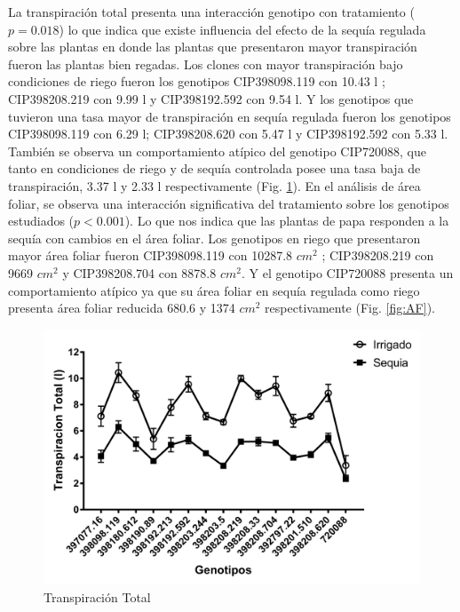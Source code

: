 \documentclass[fleqn,10pt]{Flavio}\usepackage[]{graphicx}\usepackage[]{color}
\begin{document}
La transpiraci\'on total presenta una interacci\'on genotipo con tratamiento ($p = 0.018$) lo que indica que existe influencia del efecto de la sequ\'ia regulada sobre las plantas en donde las plantas que presentaron mayor transpiraci\'on fueron las plantas bien regadas. Los clones con mayor transpiraci\'on bajo condiciones de riego fueron los genotipos CIP398098.119 con 10.43 l ; CIP398208.219 con 9.99 l y  CIP398192.592 con  9.54 l. Y los genotipos que tuvieron una tasa mayor de transpiraci\'on en sequ\'ia regulada fueron los genotipos CIP398098.119 con 6.29 l; CIP398208.620 con 5.47 l y CIP398192.592 con 5.33 l. Tambi\'en se observa un comportamiento at\'ipico del genotipo CIP720088, que tanto en condiciones de riego y de sequ\'ia controlada posee una tasa baja de transpiraci\'on, 3.37 l y 2.33 l respectivamente (Fig. \ref{fig:Trans}). En el an\'alisis de \'area foliar, se observa una interacci\'on significativa del tratamiento sobre los genotipos estudiados ($p < 0.001$). Lo que nos indica que las plantas de papa responden a la sequ\'ia con cambios en el \'area foliar. Los genotipos en riego que presentaron mayor \'area foliar fueron CIP398098.119 con 10287.8 $cm^2$ ; CIP398208.219  con 9669 $cm^2$ y CIP398208.704 con 8878.8 $cm^2$. Y el genotipo CIP720088 presenta un comportamiento at\'ipico ya que su \'area foliar en sequ\'ia regulada como riego presenta \'area foliar reducida  680.6 y 1374 $cm^2$ respectivamente (Fig. \ref{fig:AF}).

\begin{figure}[ht]\centering
\includegraphics[width=\linewidth]{Transpiracion}
\caption{Transpiraci\'on Total}
\label{fig:Trans}
\end{figure}
\end{document}
